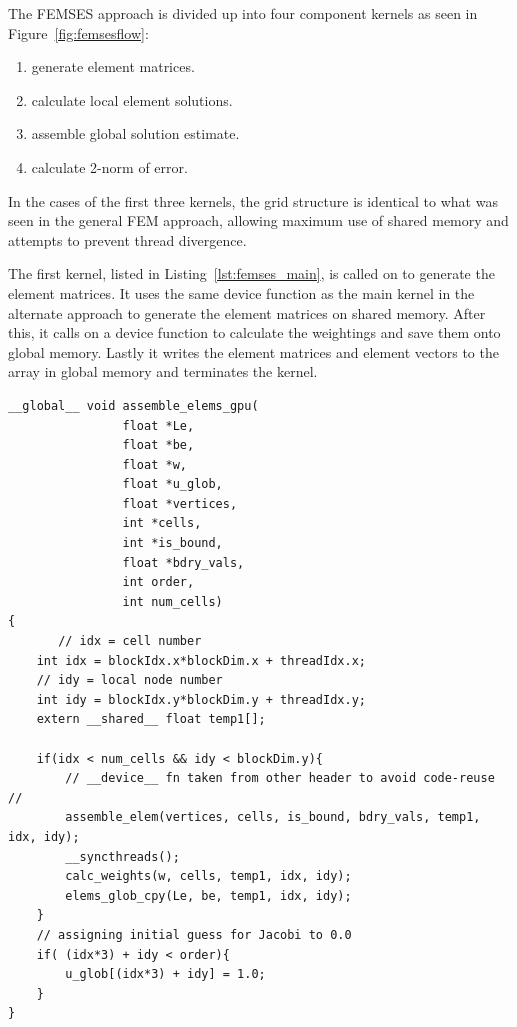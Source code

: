 The FEMSES approach is divided up into four component kernels as seen in Figure~\ref{fig:femsesflow}:
\begin{enumerate}
	\item generate element matrices.
	\item calculate local element solutions.
	\item assemble global solution estimate.
	\item calculate 2-norm of error.
\end{enumerate}
In the cases of the first three kernels, the grid structure is identical to what was seen in the general FEM approach, allowing maximum use of shared memory and attempts to prevent thread divergence.

The first kernel, listed in Listing~\ref{lst:femses_main}, is called on to generate the element matrices. It uses the same device function as the main kernel in the alternate approach to generate the element matrices on shared memory. After this, it calls on a device function to calculate the weightings and save them onto global memory. Lastly it writes the element matrices and element vectors to the array in global memory and terminates the kernel.
\begin{lstlisting}[style=cppStyle,caption={Initial kernel in FEMSES to generate element matrices and store in global memory.},label={lst:femses_main}]
__global__ void assemble_elems_gpu(
                float *Le, 
                float *be, 
                float *w,
                float *u_glob,
                float *vertices, 
                int *cells, 
                int *is_bound, 
                float *bdry_vals,
                int order,
                int num_cells)
{
	   // idx = cell number
    int idx = blockIdx.x*blockDim.x + threadIdx.x;
    // idy = local node number
    int idy = blockIdx.y*blockDim.y + threadIdx.y;
    extern __shared__ float temp1[];

    if(idx < num_cells && idy < blockDim.y){
        // __device__ fn taken from other header to avoid code-reuse //
        assemble_elem(vertices, cells, is_bound, bdry_vals, temp1, idx, idy);
        __syncthreads();
        calc_weights(w, cells, temp1, idx, idy);
        elems_glob_cpy(Le, be, temp1, idx, idy);
    }
    // assigning initial guess for Jacobi to 0.0 
    if( (idx*3) + idy < order){
        u_glob[(idx*3) + idy] = 1.0;
    }
}
\end{lstlisting}

